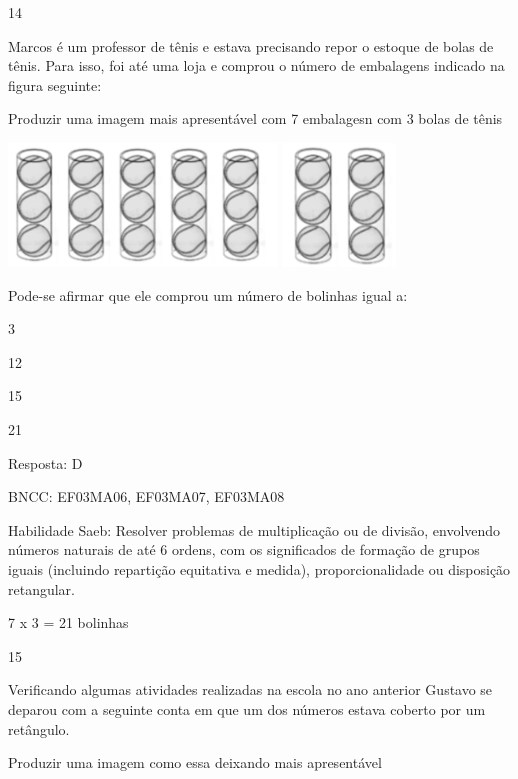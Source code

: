 \begin{escolha}
{\begin{escolha}
{\num{14}

Marcos é um professor de tênis e estava precisando repor o estoque de
bolas de tênis. Para isso, foi até uma loja e comprou o número de
embalagens indicado na figura seguinte:

Produzir uma imagem mais apresentável com 7 embalagesn com 3 bolas de
tênis

\includegraphics[width=2.80882in,height=1.29243in]{media/image139.png}
\includegraphics[width=1.18628in,height=1.28713in]{media/image140.png}

Pode-se afirmar que ele comprou um número de bolinhas igual a:

\begin{escolha}

\item
  3
\item
  12
\item
  15
\item
  21
\end{escolha}

Resposta: D

BNCC: EF03MA06, EF03MA07, EF03MA08

Habilidade Saeb: Resolver problemas de multiplicação ou de divisão,
envolvendo números naturais de até 6 ordens, com os significados de
formação de grupos iguais (incluindo repartição equitativa e medida),
proporcionalidade ou disposição retangular.

7 x 3 = 21 bolinhas

\num{15}

Verificando algumas atividades realizadas na escola no ano anterior
Gustavo se deparou com a seguinte conta em que um dos números estava
coberto por um retângulo.

Produzir uma imagem como essa deixando mais apresentável

}
\end{escolha}}
\end{escolha}
